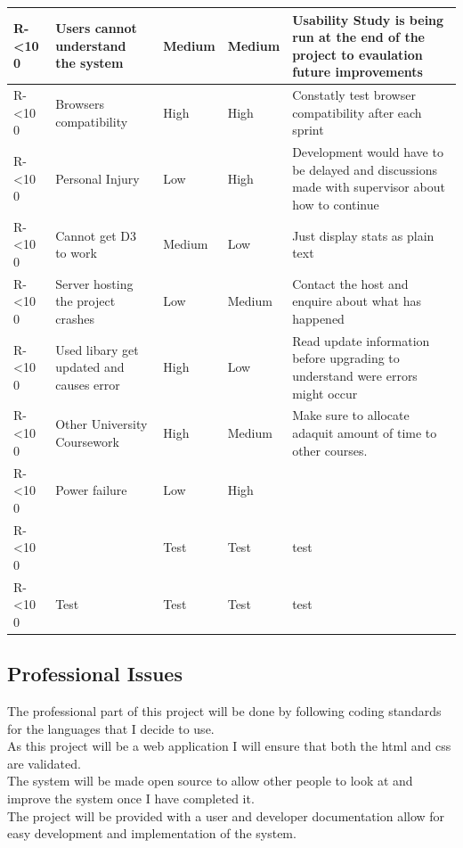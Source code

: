 \documentclass[12pt]{article}  %
\newcommand{\rid}[1]{\centering #1-\ifnum\value{requirement}<10 0\fi\arabic{requirement} \stepcounter{requirement}}
\begin{document}
\begin{spacing}{1.2}
\begin{longtable}[c]{|p{}|p{}|p{}|p{}|p{}|}
\rid{R} &Users cannot understand the system & Medium & Medium & Usability Study is being run at the end of the project to evaulation future improvements\\ \hline 

\rid{R} &Browsers compatibility & High & High & Constatly test browser compatibility after each sprint\\ \hline

\rid{R} &Personal Injury & Low & High & Development would have to be delayed and discussions made with supervisor about how to continue\\ \hline

\rid{R} & Cannot get D3 to work & Medium & Low & Just display stats as plain text\\ \hline

\rid{R} & Server hosting the project crashes & Low & Medium & Contact the host and enquire about what has happened\\ \hline

\rid{R} & Used libary get updated and causes error & High & Low & Read update information before upgrading to understand were errors might occur\\ \hline

\rid{R} & Other University Coursework & High & Medium & Make sure to allocate adaquit amount of time to other courses.\\ \hline

\rid{R} & Power failure & Low & High  & \\ \hline

\rid{R} &  & Test & Test & test\\ \hline

\rid{R} & Test&Test&Test&test\\ \hline



\end{longtable}
\end{spacing}



\newpage

\subsection{Professional Issues}
The professional part of this project will be done by following coding standards for the languages that I decide to use.\\
As this project will be a web application I will ensure that both the html and css are validated.\\
The system will be made open source to allow other people to look at and improve the system once I have completed it.\\
The project will be provided with a  user and developer documentation allow for easy development and implementation of the system.
\end{document}
